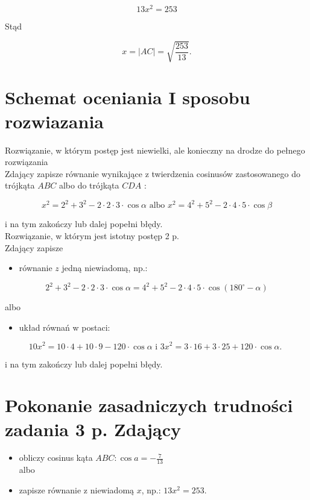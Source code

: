 \documentclass[10pt]{article}
\begin{document}
$$
13 x^{2}=253
$$

Stąd

$$
x=|A C|=\sqrt{\frac{253}{13}} .
$$

\section*{Schemat oceniania I sposobu rozwiazania}
Rozwiązanie, w którym postęp jest niewielki, ale konieczny na drodze do pełnego rozwiązania\\
Zdający zapisze równanie wynikające z twierdzenia cosinusów zastosowanego do trójkąta $A B C$ albo do trójkąta $C D A$ :

$$
x^{2}=2^{2}+3^{2}-2 \cdot 2 \cdot 3 \cdot \cos \alpha \text { albo } x^{2}=4^{2}+5^{2}-2 \cdot 4 \cdot 5 \cdot \cos \beta
$$

i na tym zakończy lub dalej popełni błędy.\\
Rozwiązanie, w którym jest istotny postęp 2 p.\\
Zdający zapisze

\begin{itemize}
  \item równanie $z$ jedną niewiadomą, np.:
\end{itemize}

$$
2^{2}+3^{2}-2 \cdot 2 \cdot 3 \cdot \cos \alpha=4^{2}+5^{2}-2 \cdot 4 \cdot 5 \cdot \cos \left(180^{\circ}-\alpha\right)
$$

albo

\begin{itemize}
  \item układ równań w postaci:
\end{itemize}

$$
10 x^{2}=10 \cdot 4+10 \cdot 9-120 \cdot \cos \alpha \text { i } 3 x^{2}=3 \cdot 16+3 \cdot 25+120 \cdot \cos \alpha \text {. }
$$

i na tym zakończy lub dalej popełni błędy.

\section*{Pokonanie zasadniczych trudności zadania 3 p. Zdający}
\begin{itemize}
  \item obliczy cosinus kąta $A B C: \cos a=-\frac{7}{13}$\\
albo
  \item zapisze równanie z niewiadomą $x$, np.: $13 x^{2}=253$.
\end{itemize}
\end{document}
